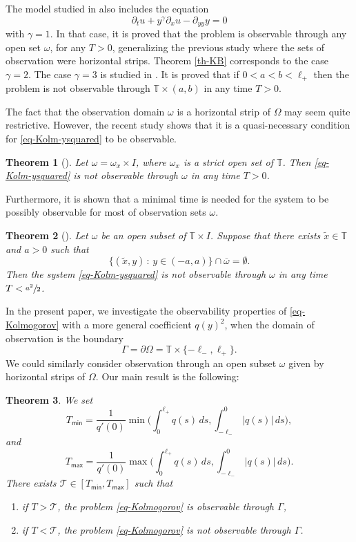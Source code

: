 \documentclass[10pt]{amsart}
\let\mathcal\mathscr
\theoremstyle{plain}
\newtheorem{theorem}{{Theorem}}[section]
\theoremstyle{definition}
\newcommand{\1}{\mathds 1}
\newcommand{\st}{\,:\,}
\newcommand{\T}{\mathbb{T}}
\let\o\omega
\let\O\Omega
\newcommand{\Tc}{{\mathcal T}}
\newcommand{\Tmin}{T_{\mathsf{min}}}
\newcommand{\Tmax}{T_{\mathsf{max}}}
\begin{document}
The model studied in \cite{Beauchard14} also includes the equation
\[
\partial_t u + y^\gamma \partial_{x} u - \partial_{yy} y = 0
\]
with $\gamma = 1$. In that case, it is proved that the problem is observable through any open set $\omega$, for any $T > 0$, generalizing the previous study \cite{Beauchard_Zuazua_09} where the sets of observation were horizontal strips. Theorem \ref{th-KB} corresponds to the case $\gamma = 2$. The case $\gamma = 3$ is studied in \cite{beauchard_henry}. It is proved that if $0<a<b< \ell_+$ then the problem is not observable through $\T \times (a,b)$ in any time $T>0$.

The fact that the observation domain $\omega$ is a horizontal strip of $\O$ may seem quite restrictive. However,
the recent study \cite{koenig18} shows that it is a quasi-necessary condition for \eqref{eq-Kolm-ysquared} to be observable.

\begin{theorem}[\cite{koenig18}] \label{th-AK1}
Let $\omega = \omega_x \times I$, where $\omega_x$ is a strict open set of $\T$.
Then \eqref{eq-Kolm-ysquared} is not observable through $\omega$ in any time $T>0$.
\end{theorem}

Furthermore, it is shown that a minimal time is needed for the system to be possibly observable for most of observation sets $\omega$.

\begin{theorem}[\cite{koenig18}] \label{th-AK2}
Let $\omega$ be an open subset of $\T \times I$. Suppose that there exists $\tilde x \in \T$ and $a > 0$ such that
\[\lbrace (\tilde x ,y)\st y \in (-a,a)\rbrace \cap \overline{\omega} = \emptyset.\]
Then the system \eqref{eq-Kolm-ysquared} is not observable through $\omega$ in any time $T< \sfrac{a^2}{2}$.
\end{theorem}

In the present paper, we investigate the observability properties of
\eqref{eq-Kolmogorov} with a more general coefficient $q(y)^2$, when the domain of observation is the boundary
\[
\Gamma = \partial \O = \T \times\lbrace -\ell_-, \ell_+\rbrace.
\]
We could similarly consider observation through an open subset $\o$ given by horizontal strips of $\O$. Our main result is the following:


\begin{theorem} \label{th-main}
We set
\[
\Tmin = \frac 1 {q'(0)} \min\biggl(\int_0^{\ell_+} q(s) \, ds , \int_{-\ell_-}^0 \vert q(s) \vert\, ds \biggr),
\]
and
\[
\Tmax = \frac 1 {q'(0)} \max\biggl(\int_0^{\ell_+} q(s) \, ds , \int_{-\ell_-}^0 \vert q(s) \vert\, ds \biggr).
\]
There exists $\Tc \in [\Tmin,\Tmax]$ such that
\begin{enumerate}
\item if $T > \Tc$, the problem \eqref{eq-Kolmogorov} is observable through $\Gamma$, \label{item-th-i}
\item if $T < \Tc$, the problem \eqref{eq-Kolmogorov} is not observable through $\Gamma$. \label{item-th-ii}
\end{enumerate}
\end{theorem}
\end{document}
